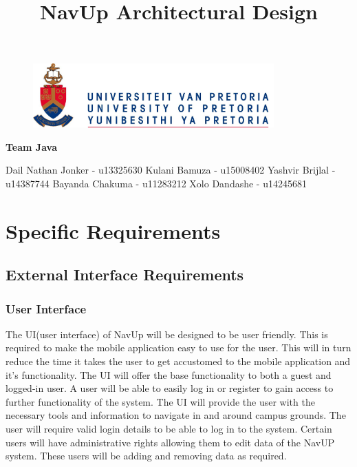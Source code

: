 \documentclass{article}
\begin{document}
\begin{figure}[t]
			\centering
			\includegraphics[width=350px]{UP_Logo.jpg}
\end{figure}
\title{NavUp Architectural Design}
\maketitle
		\begin{center}
			\textbf{\newline Team Java} \\
		\end{center}
		
		\begin{flushright} \large
			Dail Nathan Jonker - u13325630 \newline
			Kulani Bamuza - u15008402 \newline
			Yashvir Brijlal - u14387744 \newline
			Bayanda Chakuma - u11283212 \newline
			Xolo Dandashe - u14245681 \newline     
		\end{flushright}
\clearpage
\tableofcontents
	
\clearpage
\section{Specific Requirements}
	\subsection{External Interface Requirements}
		\subsubsection{User Interface}
The UI(user interface) of NavUp will be designed to be user friendly. This is required to make the mobile application easy to use for the user. This will in turn reduce the time it takes the user to get accustomed to the mobile application and it's functionality. The UI will offer the base functionality to both a guest and logged-in user. A user will be able to easily log in or register to gain access to further functionality of the system. The UI will provide the user with the necessary tools and information to navigate in and around campus grounds. The user will require valid login details to be able to log in to the system. Certain users will have administrative rights allowing them to edit data of the NavUP system. These users will be adding and removing data as required.
\end{document}
